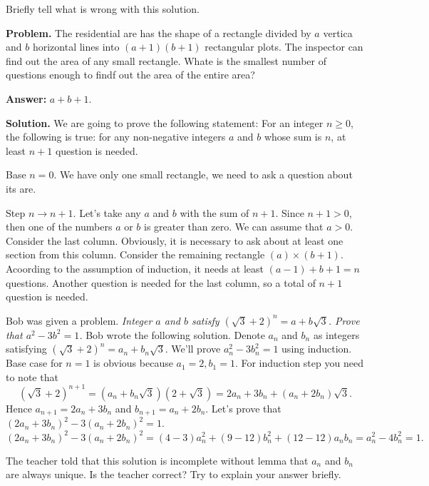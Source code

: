 \begin{section-problem}
    Briefly tell what is wrong with this solution.

    \textbf{Problem.} The residential are has the shape of a rectangle divided by $a$ vertica and $b$ horizontal lines into $(a + 1)(b + 1)$ rectangular plots.
    The inspector can find out the area of any small rectangle.
    Whate is the smallest number of questions enough to findf out the area of the entire area?

    \textbf{Answer:} $a + b + 1$.

    \textbf{Solution.} We are going to prove the following statement: For an integer $n \geq 0$, the following is true: for any non-negative integers $a$ and $b$ whose sum is $n$, at least $n + 1$ question is needed.

    Base $n = 0$.
    We have only one small rectangle, we need to ask a question about its are.

    Step $n \to n + 1$.
    Let's take any $a$ and $b$ with the sum of $n + 1$.
    Since $n + 1 > 0$, then one of the numbers $a$ or $b$ is greater than zero.
    We can assume that $a > 0$.
    Consider the last column.
    Obviously, it is necessary to ask about at least one section from this column.
    Consider the remaining rectangle $(a) \times (b + 1)$.
    Acoording to the assumption of induction, it needs at least $(a - 1) + b + 1 = n$ questions.
    Another question is needed for the last column, so a total of $n + 1$ question is needed.
\end{section-problem}

\begin{section-problem}
    Bob was given a problem.
    \textit{Integer $a$ and $b$ satisfy $(\sqrt {3} + 2)^n = a + b\sqrt {3}$.
    Prove that $a^2 - 3b^2 = 1$.}
    Bob wrote the following solution.
    Denote $a_n$ and $b_n$ as integers satisfying $(\sqrt {3} + 2)^n = a_n + b_n \sqrt {3}$.
    We'll prove $a_n^2 - 3b_n^2 = 1$ using induction.
    Base case for $n = 1$ is obvious because $a_1 = 2, b_1 = 1$.
    For induction step you need to note that
    \[
        \left(\sqrt {3} + 2\right)^{n + 1} = \left(a_n + b_n \sqrt {3}\right)\left(2 + \sqrt {3}\right) = 2a_n + 3b_n + (a_n + 2b_n)\sqrt {3}.
    \]
    Hence $a_{n + 1} = 2a_n + 3b_n$ and $b_{n + 1} = a_n + 2b_n$.
    Let's prove that $\left(2a_n + 3b_n\right)^2 - 3\left(a_n + 2b_n\right)^2 = 1$.
    \[
        \left(2a_n + 3b_n\right)^2 - 3\left(a_n + 2b_n\right)^2 = (4 - 3)a_n^2 + (9 - 12)b_n^2 + (12 - 12)a_n b_n = a_n^2 - 4b_n^2 = 1.
    \]

    The teacher told that this solution is incomplete without lemma that $a_n$ and $b_n$ are always unique.
    Is the teacher correct?
    Try to explain your answer briefly.
\end{section-problem}

